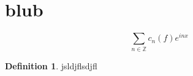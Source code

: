 \documentclass{article}
\theoremstyle{definition}
\newtheorem{definition}{Definition}[section]
\begin{document}
\section{blub}

\begin{equation*}    
    \sum_{n \in \mathbb{Z}} c_n(f) e^{inx}
\end{equation*}

\begin{definition}
    jsldjflsdjfl
\end{definition}
\end{document}
